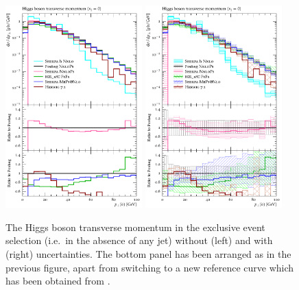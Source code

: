 \begin{figure}[t!]
  \centering
  \includegraphics[width=0.47\textwidth]{figures/hjetscomp_u_H_pT_excl.pdf}
  \hfill
  \includegraphics[width=0.47\textwidth]{figures/hjetscomp_H_pT_excl.pdf}
  \caption{\label{fig:hjetscomp:results:exclobs:hpt}%
    The Higgs boson transverse momentum in the exclusive event
    selection (i.e.~in the absence of any jet) without (left) and with
    (right) uncertainties. The bottom panel has been arranged as in
    the previous figure, apart from switching to a new reference curve
    which has been obtained from \Powheg \NNLOPS.}
\end{figure}

